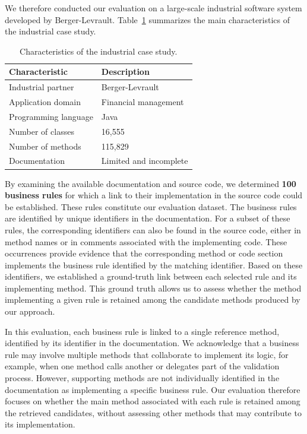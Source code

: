 We therefore conducted our evaluation on a large-scale industrial software system developed by Berger-Levrault. Table~\ref{tab:case-study} summarizes the main characteristics of the industrial case study.

\begin{table}[htbp]
\centering
\caption{Characteristics of the industrial case study.}
\label{tab:case-study}
\begin{tabular}{ll}
\toprule
\textbf{Characteristic} & \textbf{Description} \\
\midrule
Industrial partner & Berger-Levrault \\
Application domain & Financial management \\
Programming language & Java \\
Number of classes & 16,555 \\
Number of methods & 115,829 \\
Documentation & Limited and incomplete \\
\bottomrule
\end{tabular}
\end{table}

By examining the available documentation and source code, we determined \textbf{100 business rules} for which a link to their implementation in the source code could be established. These rules constitute our evaluation dataset. The business rules are identified by unique identifiers in the documentation. For a subset of these rules, the corresponding identifiers can also be found in the source code, either in method names or in comments associated with the implementing code. These occurrences provide evidence that the corresponding method or code section implements the business rule identified by the matching identifier. Based on these identifiers, we established a ground-truth link between each selected rule and its implementing method. This ground truth allows us to assess whether the method implementing a given rule is retained among the candidate methods produced by our approach.

In this evaluation, each business rule is linked to a single reference method, identified by its identifier in the documentation. We acknowledge that a business rule may involve multiple methods that collaborate to implement its logic, for example, when one method calls another or delegates part of the validation process. However, supporting methods are not individually identified in the documentation as implementing a specific business rule. Our evaluation therefore focuses on whether the main method associated with each rule is retained among the retrieved candidates, without assessing other methods that may contribute to its implementation.

